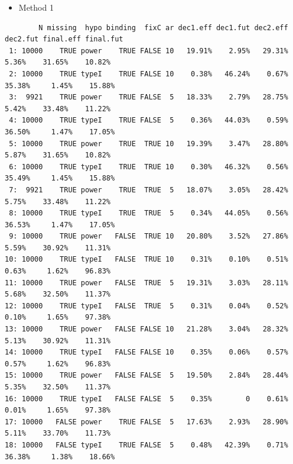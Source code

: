\documentclass[12pt]{article}
\begin{document}
\begin{itemize}
\item Method 1
\end{itemize}
\begin{verbatim}
        N missing  hypo binding  fixC ar dec1.eff dec1.fut dec2.eff dec2.fut final.eff final.fut
 1: 10000    TRUE power    TRUE FALSE 10   19.91%    2.95%   29.31%    5.36%    31.65%    10.82%
 2: 10000    TRUE typeI    TRUE FALSE 10    0.38%   46.24%    0.67%   35.38%     1.45%    15.88%
 3:  9921    TRUE power    TRUE FALSE  5   18.33%    2.79%   28.75%    5.42%    33.48%    11.22%
 4: 10000    TRUE typeI    TRUE FALSE  5    0.36%   44.03%    0.59%   36.50%     1.47%    17.05%
 5: 10000    TRUE power    TRUE  TRUE 10   19.39%    3.47%   28.80%    5.87%    31.65%    10.82%
 6: 10000    TRUE typeI    TRUE  TRUE 10    0.30%   46.32%    0.56%   35.49%     1.45%    15.88%
 7:  9921    TRUE power    TRUE  TRUE  5   18.07%    3.05%   28.42%    5.75%    33.48%    11.22%
 8: 10000    TRUE typeI    TRUE  TRUE  5    0.34%   44.05%    0.56%   36.53%     1.47%    17.05%
 9: 10000    TRUE power   FALSE  TRUE 10   20.80%    3.52%   27.86%    5.59%    30.92%    11.31%
10: 10000    TRUE typeI   FALSE  TRUE 10    0.31%    0.10%    0.51%    0.63%     1.62%    96.83%
11: 10000    TRUE power   FALSE  TRUE  5   19.31%    3.03%   28.11%    5.68%    32.50%    11.37%
12: 10000    TRUE typeI   FALSE  TRUE  5    0.31%    0.04%    0.52%    0.10%     1.65%    97.38%
13: 10000    TRUE power   FALSE FALSE 10   21.28%    3.04%   28.32%    5.13%    30.92%    11.31%
14: 10000    TRUE typeI   FALSE FALSE 10    0.35%    0.06%    0.57%    0.57%     1.62%    96.83%
15: 10000    TRUE power   FALSE FALSE  5   19.50%    2.84%   28.44%    5.35%    32.50%    11.37%
16: 10000    TRUE typeI   FALSE FALSE  5    0.35%        0    0.61%    0.01%     1.65%    97.38%
17: 10000   FALSE power    TRUE FALSE  5   17.63%    2.93%   28.90%    5.11%    33.70%    11.73%
18: 10000   FALSE typeI    TRUE FALSE  5    0.48%   42.39%    0.71%   36.38%     1.38%    18.66%
\end{verbatim}
\end{document}
